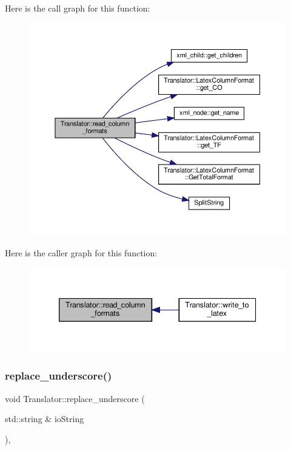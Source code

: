 Here is the call graph for this function\+:
\nopagebreak
\begin{figure}[H]
\begin{center}
\leavevmode
\includegraphics[width=350pt]{d4/dee/classTranslator_a662c8c69ec0358da47990c1cb283af0f_cgraph}
\end{center}
\end{figure}
Here is the caller graph for this function\+:
\nopagebreak
\begin{figure}[H]
\begin{center}
\leavevmode
\includegraphics[width=339pt]{d4/dee/classTranslator_a662c8c69ec0358da47990c1cb283af0f_icgraph}
\end{center}
\end{figure}
\mbox{\label{classTranslator_ae281dabc048b77d9527fad9374e0d9cc}} 
\subsubsection{\texorpdfstring{replace\+\_\+underscore()}{replace\_underscore()}}
{\footnotesize\ttfamily void Translator\+::replace\+\_\+underscore (\begin{DoxyParamCaption}\item[{std\+::string \&}]{io\+String }\end{DoxyParamCaption})\hspace{0.3cm}{\ttfamily [static]}, {\ttfamily [private]}}



